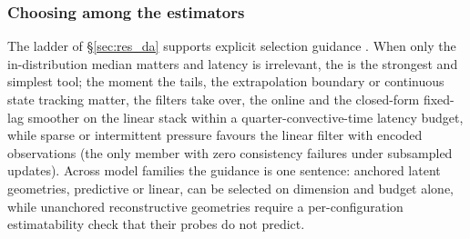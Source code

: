\subsubsection*{Choosing among the estimators}
\label{sec:disc_choosing}

The ladder of \S\ref{sec:res_da} supports explicit selection guidance
\citep{gupta2026}. When only the in-distribution median matters and latency is
irrelevant, the \StaticInv{} is the strongest and simplest tool; the moment the
tails, the extrapolation boundary or continuous state tracking matter, the filters
take over, the \TwoStageKF{} online and the closed-form fixed-lag smoother on the
linear stack within a quarter-convective-time latency budget, while sparse or
intermittent pressure favours the linear filter with encoded observations (the
only member with zero consistency failures under subsampled updates). Across model
families the guidance is one sentence: anchored latent geometries, predictive or
linear, can be selected on dimension and budget alone, while unanchored
reconstructive geometries require a per-configuration estimatability check that
their probes do not predict.\re
